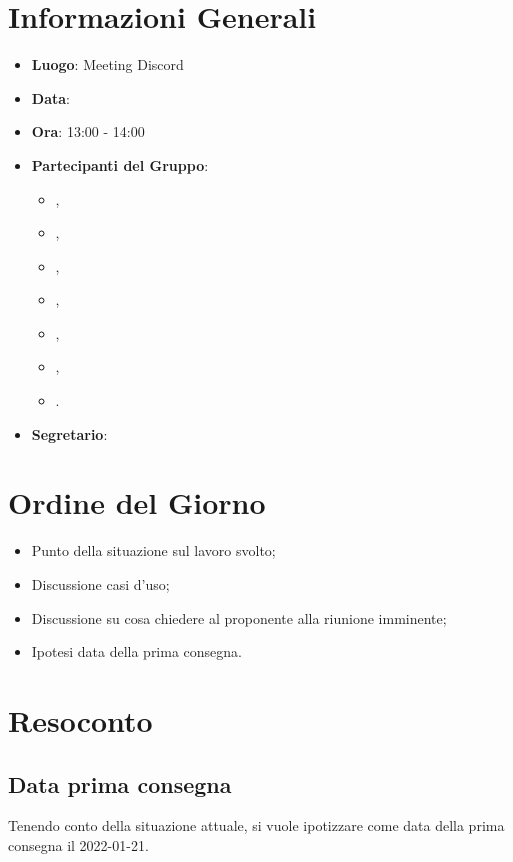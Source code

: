 \section{Informazioni Generali}

\begin{itemize}
\item{\textbf{Luogo}}: Meeting Discord
\item{\textbf{Data}}: \D{}
\item{\textbf{Ora}}: 13:00 - 14:00
\item{\textbf{Partecipanti del Gruppo}}: 
	\begin{itemize}
	\item{\EP{},} 
	\item{\FP{},}
	\item{\GC{},}
	\item{\LW{},}
	\item{\MB{},}
	\item{\MG{},}
	\item{\PV{}.}
	\end{itemize} 
\item{\textbf{Segretario}}: \PV{}	
\end{itemize}

\section{Ordine del Giorno}
\begin{itemize}
\item{Punto della situazione sul lavoro svolto;}
\item{Discussione casi d'uso;}
\item{Discussione su cosa chiedere al proponente alla riunione imminente;}
\item{Ipotesi data della prima consegna.}
\end{itemize}

\section{Resoconto}

\subsection{Data prima consegna}
Tenendo conto della situazione attuale, si vuole ipotizzare come data della prima consegna il 2022-01-21.
